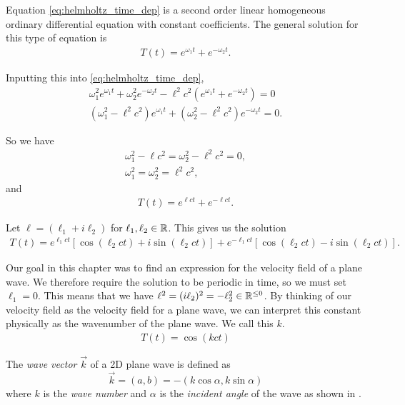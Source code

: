 Equation \eqref{eq:helmholtz_time_dep} is a second order linear homogeneous ordinary differential equation with constant coefficients. The general solution for this type of equation is
\begin{align}\label{eq:gen_sol_time_dep}
  T(t) = e^{\omega_1t} + e^{-\omega_2t}.
\end{align}

Inputting this into \ref{eq:helmholtz_time_dep},
\begin{gather*}
  \omega_1^2e^{\omega_1t} + \omega_2^2e^{-\omega_2t} - \ell^2 c^2 (e^{\omega_1t} + e^{-\omega_2t})=0 \\
  (\omega_1^2 - \ell^2 c^2)e^{\omega_1t} +  (\omega_2^2 - \ell^2 c^2)e^{-\omega_2t}=0.
\end{gather*}

So we have
\begin{gather*}
  \omega_1^2 - \ell c^2 = \omega_2^2 - \ell^2 c^2 = 0, \\
  \omega_1^2 = \omega_2^2 = \ell^2 c^2,
\end{gather*}
and
\begin{gather*}
  T(t) = e^{\ell c t} + e^{-\ell c t}.
\end{gather*}

Let $\ell = (\ell_1 + i\ell_2)$ for $\ell_1, \ell_2 \in \mathbb{R}$. This gives us the solution
  \begin{align*}
    T(t) = e^{\ell_1 c t}[\cos(\ell_2 c t) + i \sin(\ell_2 c t)] + e^{- \ell_1 c t}[\cos(\ell_2 c t) - i \sin(\ell_2 c t)].
  \end{align*}

Our goal in this chapter was to find an expression for the velocity field of a plane wave. We therefore require the solution to be periodic in time, so we must set $\ell_1 = 0$. This means that we have $\ell^2 = (i\ell_2)^2 = - \ell_2^2 \in \mathbb{R}^{\leq 0}$. By thinking of our velocity field as the velocity field for a plane wave, we can interpret this constant physically as the wavenumber of the plane wave. We call this $k$.
\begin{align*}
  T(t) = \cos(kct)
\end{align*}

\begin{defn}\label{defn:wave_vector}
The \emph{wave vector} $\vec{k}$ of a 2D plane wave is defined as
    \[ \vec{k} = (a, b) = -(k\cos\alpha, k\sin\alpha)
    \]
where $k$ is the \emph{wave number} and $\alpha$ is the \emph{incident angle} of the wave as shown in .
\end{defn}

